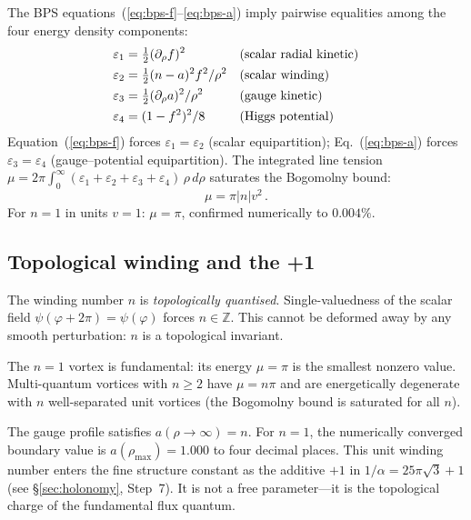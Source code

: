 \documentclass[11pt]{article}
\newcommand{\half}{\tfrac{1}{2}}
\begin{document}
The BPS equations~(\ref{eq:bps-f}--\ref{eq:bps-a}) imply
pairwise equalities among the four energy density components:
\begin{align}
  \varepsilon_1 &= \half(\partial_\rho f)^2
    &&\text{(scalar radial kinetic)}\notag\\
  \varepsilon_2 &= \half(n-a)^2 f^2/\rho^2
    &&\text{(scalar winding)}\label{eq:energy-components}\\
  \varepsilon_3 &= \half(\partial_\rho a)^2/\rho^2
    &&\text{(gauge kinetic)}\notag\\
  \varepsilon_4 &= (1-f^2)^2/8
    &&\text{(Higgs potential)}\notag
\end{align}
Equation~(\ref{eq:bps-f}) forces $\varepsilon_1 = \varepsilon_2$
(scalar equipartition); Eq.~(\ref{eq:bps-a}) forces
$\varepsilon_3 = \varepsilon_4$ (gauge--potential equipartition).
The integrated line tension
$\mu = 2\pi\int_0^\infty
(\varepsilon_1+\varepsilon_2+\varepsilon_3+\varepsilon_4)\,
\rho\,d\rho$ saturates the Bogomolny bound:
\begin{equation}
\label{eq:bogomolny}
  \mu = \pi |n| v^2\,.
\end{equation}
For $n = 1$ in units $v = 1$: $\mu = \pi$, confirmed numerically
to $0.004\%$.

\subsection{Topological winding and the +1}
\label{sec:winding}

The winding number $n$ is \emph{topologically quantised}.
Single-valuedness of the scalar field
$\psi(\varphi + 2\pi) = \psi(\varphi)$ forces $n \in \mathbb{Z}$.
This cannot be deformed away by any smooth perturbation: $n$ is a
topological invariant.

The $n = 1$ vortex is fundamental: its energy $\mu = \pi$ is the
smallest nonzero value.  Multi-quantum vortices with $n \geq 2$
have $\mu = n\pi$ and are energetically degenerate with $n$
well-separated unit vortices (the Bogomolny bound is saturated
for all $n$).

The gauge profile satisfies $a(\rho \to \infty) = n$.  For $n=1$,
the numerically converged boundary value is $a(\rho_\text{max}) =
1.000$ to four decimal places.  This unit winding number enters
the fine structure constant as the additive $+1$ in
$1/\alpha = 25\pi\sqrt{3}+1$ (see \S\ref{sec:holonomy}, Step~7).
It is not a free parameter---it is the topological charge of the
fundamental flux quantum.
\end{document}
